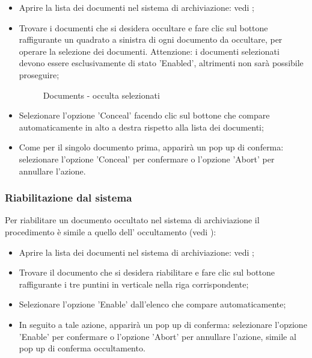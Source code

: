 \documentclass[10pt, a4paper]{article}
\begin{document}
\begin{itemize}
    \item Aprire la lista dei documenti nel sistema di archiviazione: vedi ;
    \item Trovare i documenti che si desidera occultare e fare clic sul bottone raffigurante un quadrato a sinistra di ogni documento da occultare, per operare la selezione dei documenti. Attenzione: i documenti selezionati devono essere esclusivamente di stato 'Enabled', altrimenti non sarà possibile proseguire;
    \begin{figure}[H]
        \centering  
        \caption{Documents - occulta selezionati}
        \label{img:confirmConcealSel}
    \end{figure}

    \item Selezionare l'opzione 'Conceal' facendo clic sul bottone che compare automaticamente in alto a destra rispetto alla lista dei documenti; 
    \item Come per il singolo documento prima, apparirà un pop up di conferma: selezionare l'opzione 'Conceal' per confermare o l'opzione 'Abort' per annullare l'azione.
\end{itemize}


\subsubsection{Riabilitazione dal sistema}
Per riabilitare un documento occultato nel sistema di archiviazione il procedimento è simile a quello dell' occultamento (vedi ):
\begin{itemize}
    \item Aprire la lista dei documenti nel sistema di archiviazione: vedi ;
    \item Trovare il documento che si desidera riabilitare e fare clic sul bottone raffigurante i tre puntini in verticale nella riga corrispondente;
    \item Selezionare l'opzione 'Enable' dall'elenco che compare automaticamente;
    \item In seguito a tale azione, apparirà un pop up di conferma: selezionare l'opzione 'Enable' per confermare o l'opzione 'Abort' per annullare l'azione, simile al pop up di conferma occultamento.
\end{itemize}
\end{document}
